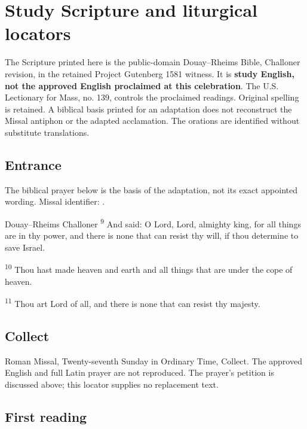 \section{Study Scripture and liturgical locators}
The Scripture printed here is the public-domain Douay--Rheims Bible, Challoner revision, in the retained Project Gutenberg 1581 witness. It is \textbf{study English, not the approved English proclaimed at this celebration}. The U.S. Lectionary for Mass, no. 139, controls the proclaimed readings. Original spelling is retained. A biblical basis printed for an adaptation does not reconstruct the Missal antiphon or the adapted acclamation. The orations are identified without substitute translations.

\subsection{Entrance}
\label{proper-entrance}
The biblical prayer below is the basis of the adaptation, not its exact appointed wording. Missal identifier: .
\begin{englishwitness}{Douay--Rheims Challoner}
\textsuperscript{9} And said: O Lord, Lord, almighty king, for all things are in thy power, and there is none that can resist thy will, if thou determine to save Israel.

\textsuperscript{10} Thou hast made heaven and earth and all things that are under the cope of heaven.

\textsuperscript{11} Thou art Lord of all, and there is none that can resist thy majesty.
\end{englishwitness}

\subsection{Collect}
\label{proper-collect}
Roman Missal, Twenty-seventh Sunday in Ordinary Time, Collect. The approved English and full Latin prayer are not reproduced. The prayer's petition is discussed above; this locator supplies no replacement text.

\subsection{First reading}
\label{proper-first-reading}

